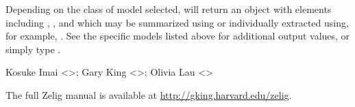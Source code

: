 \begin{Value}
Depending on the class of model selected,  will return
an object with elements including , ,
and  which may be summarized using
 or individually extracted using, for example,
.  See the specific models listed above
for additional output values, or simply type .
\end{Value}
\begin{Author}\relax
Kosuke Imai <>; Gary King
<>; Olivia Lau <>
\end{Author}
\begin{SeeAlso}\relax
The full Zelig manual is available at
\url{http://gking.harvard.edu/zelig}.
\end{SeeAlso}


